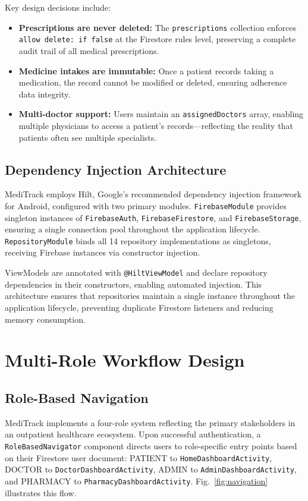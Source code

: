 \documentclass[journal,onecolumn,web]{ieeecolor}
\begin{document}
Key design decisions include:

\begin{itemize}
\item {\bf Prescriptions are never deleted:} The
{\tt prescriptions} collection enforces
{\tt allow delete: if false} at the Firestore rules
level, preserving a complete audit trail of all
medical prescriptions.

\item {\bf Medicine intakes are immutable:} Once a
patient records taking a medication, the record
cannot be modified or deleted, ensuring adherence
data integrity.

\item {\bf Multi-doctor support:} Users maintain an
{\tt assignedDoctors} array, enabling multiple
physicians to access a patient's
records---reflecting the reality that patients often
see multiple specialists.
\end{itemize}

\subsection{Dependency Injection Architecture}
MediTrack employs Hilt, Google's recommended dependency
injection framework for Android, configured with two
primary modules. {\tt FirebaseModule} provides singleton
instances of {\tt FirebaseAuth},
{\tt FirebaseFirestore}, and {\tt FirebaseStorage},
ensuring a single connection pool throughout the
application lifecycle. {\tt RepositoryModule} binds all
14 repository implementations as singletons, receiving
Firebase instances via constructor injection.

ViewModels are annotated with {\tt @HiltViewModel} and
declare repository dependencies in their constructors,
enabling automated injection. This architecture ensures
that repositories maintain a single instance throughout
the application lifecycle, preventing duplicate
Firestore listeners and reducing memory consumption.


\section{Multi-Role Workflow Design}
\label{sec:workflows}

\subsection{Role-Based Navigation}
MediTrack implements a four-role system reflecting the
primary stakeholders in an outpatient healthcare
ecosystem. Upon successful authentication, a
{\tt RoleBasedNavigator} component directs users to
role-specific entry points based on their Firestore
user document: PATIENT to
{\tt HomeDashboardActivity}, DOCTOR to
{\tt DoctorDashboardActivity}, ADMIN to
{\tt AdminDashboardActivity}, and PHARMACY to
{\tt PharmacyDashboardActivity}.
Fig.~\ref{fig:navigation} illustrates this flow.
\end{document}
